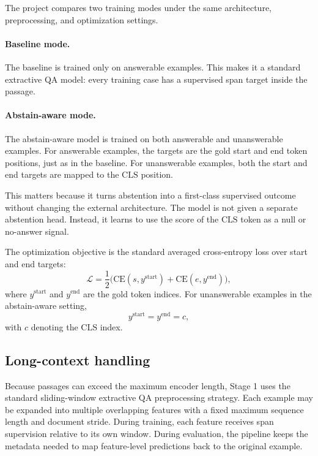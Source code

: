 The project compares two training modes under the same architecture,
preprocessing, and optimization settings.

\paragraph{Baseline mode.}
The baseline is trained only on answerable examples.
This makes it a standard extractive QA model:
every training case has a supervised span target inside the passage.

\paragraph{Abstain-aware mode.}
The abstain-aware model is trained on both answerable and unanswerable
examples.
For answerable examples, the targets are the gold start and end token
positions, just as in the baseline.
For unanswerable examples, both the start and end targets are mapped to the
\(\mathrm{CLS}\) position.

This matters because it turns abstention into a first-class supervised outcome
without changing the external architecture.
The model is not given a separate abstention head.
Instead, it learns to use the score of the \(\mathrm{CLS}\) token as a null or
no-answer signal.

The optimization objective is the standard averaged cross-entropy loss over
start and end targets:
\begin{equation}
  \mathcal{L}
  =
  \frac{1}{2}
  \Big(
    \mathrm{CE}(s, y^{\mathrm{start}})
    +
    \mathrm{CE}(e, y^{\mathrm{end}})
  \Big),
\end{equation}
where \(y^{\mathrm{start}}\) and \(y^{\mathrm{end}}\) are the gold token
indices.
For unanswerable examples in the abstain-aware setting,
\begin{equation}
  y^{\mathrm{start}} = y^{\mathrm{end}} = c,
\end{equation}
with $c$ denoting the \(\mathrm{CLS}\) index.

\subsection{Long-context handling}

Because passages can exceed the maximum encoder length, Stage 1 uses the
standard sliding-window extractive QA preprocessing strategy.
Each example may be expanded into multiple overlapping features with a fixed
maximum sequence length and document stride.
During training, each feature receives span supervision relative to its own
window.
During evaluation, the pipeline keeps the metadata needed to map feature-level
predictions back to the original example.


